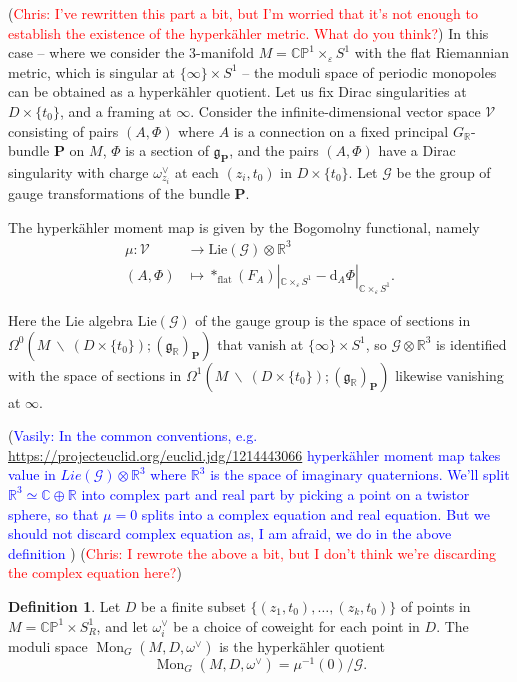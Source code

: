 \documentclass[11pt, oneside, reqno]{amsart}
\theoremstyle{definition} \newtheorem{definition}{Definition}[section]
\theoremstyle{definition} \newtheorem{remark}[definition]{Remark}
\theoremstyle{definition} \newtheorem{remarks}[definition]{Remarks}
\theoremstyle{definition} \newtheorem{question}[definition]{Question}
\theoremstyle{definition} \newtheorem*{note}{Note}
\theoremstyle{definition} \newtheorem{example}[definition]{Example}
\theoremstyle{definition} \newtheorem{examples}[definition]{Examples}
\renewcommand{\gg}{\mathfrak{g}}
\newcommand{\bb}[1]{\mathbb{#1}}
\newcommand{\mr}[1]{\mathrm{#1}}
\newcommand{\mc}[1]{\mathcal{#1}}
\newcommand{\bo}[1]{\boldsymbol{#1}}
\newcommand{\bs}{\ \backslash \ }
\newcommand{\CC}{\mathbb{C}}
\newcommand{\RR}{\mathbb{R}}
\newcommand{\eps}{\varepsilon}
\DeclareMathOperator{\mon}{Mon}
\renewcommand{\d}{\mathrm{d}}
\newcommand{\chris}[1]{(\textcolor{red}{Chris: #1})}
\newcommand{\vasily}[1]{(\textcolor{blue}{Vasily: #1})}
\begin{document}
\chris{I've rewritten this part a bit, but I'm worried that it's not enough to establish the existence of the hyperk\"ahler metric.  What do you think?}
In this case -- where we consider the 3-manifold $M = \bb{CP}^1 \times_\eps S^1$ with the flat Riemannian metric, which is singular at $\{\infty\} \times S^1$ -- the moduli space of periodic monopoles can be obtained as a hyperk\"ahler quotient.  Let us fix Dirac singularities at $D \times \{t_0\}$, and a framing at $\infty$.  Consider the infinite-dimensional vector space $\mc V$ consisting of pairs $(A,\Phi)$ where $A$ is a connection on a fixed principal $G_\RR$-bundle $\bo P$ on $M$, $\Phi$ is a section of $\gg_{\bo P}$, and the pairs $(A,\Phi)$ have a Dirac singularity with charge $\omega^\vee_{z_i}$ at each $(z_i,t_0)$ in $D \times \{t_0\}$.  Let $\mc G$ be the group of gauge transformations of the bundle $\bo P$.

The hyperk\"ahler moment map is given by the Bogomolny functional, namely
\begin{align*}
\mu \colon \mc V &\to \mr{Lie}(\mc G) \otimes \RR^3 \\
(A,\Phi) &\mapsto \ast_{\mr{flat}} (F_A)|_{\CC \times_\eps S^1}- \d_A \Phi|_{\CC \times_\eps S^1}.
\end{align*}

Here the Lie algebra $\mr{Lie}(\mc G)$ of the gauge group is the space of sections in $\Omega^0(M \bs (D \times \{t_0\}); (\gg_\RR)_{\bo P})$ that vanish at $\{\infty\} \times S^1$, so $\mc G \otimes \RR^3$ is identified with the space of sections in $\Omega^1(M \bs (D \times \{t_0\}); (\gg_\RR)_{\bo P})$ likewise vanishing at $\infty$.

\vasily{In the common conventions, e.g. \url{https://projecteuclid.org/euclid.jdg/1214443066} hyperk\"ahler moment map takes value in $Lie(\mc G) \otimes \mathbb{R}^3$ where $\mathbb{R}^3$ is the space of imaginary quaternions. 
  We'll split $\mathbb{R}^{3} \simeq \mathbb{C} \oplus \mathbb{R}$ into complex part
  and real part by picking a point on a twistor sphere, so that $\mu  = 0$
  splits into a complex equation and real equation. But we should not discard complex
equation as, I am afraid, we do in the above definition } \chris{I rewrote the above a bit, but I don't think we're discarding the complex equation here?}

\begin{definition} \label{monopole_moduli_def}
Let $D$ be a finite subset $\{(z_1,t_0), \ldots, (z_k, t_0)\}$ of points in $M = \bb{CP}^1 \times S^1_R$, and let $\omega^\vee_{i}$ be a choice of coweight for each point in $D$. The moduli space $\mon_G(M, D, \omega^\vee)$ is the hyperk\"ahler quotient
\[\mon_G(M, D, \omega^\vee) = \mu^{-1}(0) / \mc G.\]
\end{definition}
\end{document}
